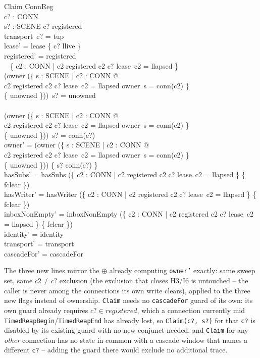 \documentclass[a4paper,10pt,fleqn]{article}
\begin{document}
\begin{schema}{Claim}
  \Delta ConnReg \\
  c? : CONN \\
  s? : SCENE
\where
  c? \in registered \\
  transport~c? = tup \\
  lease' = lease \oplus \{ c? \mapsto llive \} \\
  registered' = registered \setminus \\
  \quad~ \{ c2 : CONN | c2 \in registered \land c2 \neq c? \land
    lease~c2 = llapsed \} \\
  (owner \oplus (\{ s : SCENE | \exists c2 : CONN @ \\
    \qquad c2 \in registered \land c2 \neq c? \land lease~c2 = llapsed
    \land owner~s = conn(c2) \} \\
    \qquad \cross \{ unowned \}))~s? = unowned \\
  \lor \\
  (owner \oplus (\{ s : SCENE | \exists c2 : CONN @ \\
    \qquad c2 \in registered \land c2 \neq c? \land lease~c2 = llapsed
    \land owner~s = conn(c2) \} \\
    \qquad \cross \{ unowned \}))~s? = conn(c?) \\
  owner' = (owner \oplus (\{ s : SCENE | \exists c2 : CONN @ \\
    \qquad c2 \in registered \land c2 \neq c? \land lease~c2 = llapsed
    \land owner~s = conn(c2) \} \\
    \qquad \cross \{ unowned \})) \oplus \{ s? \mapsto conn(c?) \} \\
  hasSubs' = hasSubs \oplus (\{ c2 : CONN | c2 \in registered \land
    c2 \neq c? \land lease~c2 = llapsed \} \cross \{ fclear \}) \\
  hasWriter' = hasWriter \oplus (\{ c2 : CONN | c2 \in registered \land
    c2 \neq c? \land lease~c2 = llapsed \} \cross \{ fclear \}) \\
  inboxNonEmpty' = inboxNonEmpty \oplus (\{ c2 : CONN | c2 \in registered
    \land c2 \neq c? \land lease~c2 = llapsed \} \cross \{ fclear \}) \\
  identity' = identity \\
  transport' = transport \\
  cascadeFor' = cascadeFor
\end{schema}

The three new lines mirror the \(\oplus\) already computing \texttt{owner'}
exactly: same sweep set, same \(c2 \neq c?\) exclusion (the exclusion that
closes H3/I6 is untouched -- the caller is never among the connections
its own write clears), applied to the three new flags instead of ownership.
\texttt{Claim} needs no \texttt{cascadeFor} guard of its own: its own guard
already requires \texttt{$c? \in registered$}, which a connection currently
mid \texttt{TimedReapBegin}/\texttt{TimedReapEnd} has already lost, so
\texttt{Claim(c?, s?)} for that \texttt{c?} is disabled by its existing
guard with no new conjunct needed, and \texttt{Claim} for any \emph{other}
connection has no state in common with a cascade window that names a
different \texttt{c?} -- adding the guard there would exclude no
additional trace.
\end{document}

